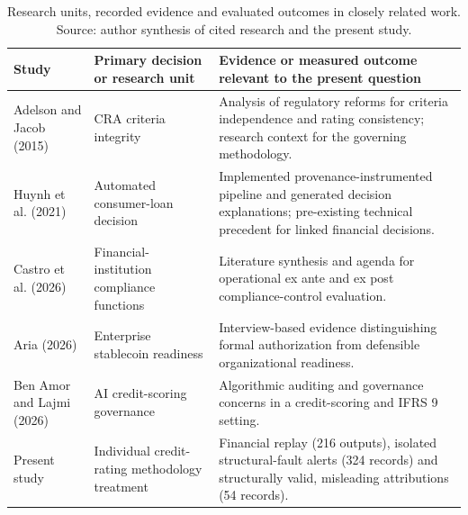 \setcounter{table}{0}
\begin{table}[!htbp]
\centering
\caption{Research units, recorded evidence and evaluated outcomes in closely related work. Source: author synthesis of cited research and the present study.}
\label{tab:lineage}
\footnotesize
\setlength{\tabcolsep}{4pt}
\renewcommand{\arraystretch}{1.22}
\begin{tabularx}{\textwidth}{p{28mm}p{30mm}X}
\toprule
\textbf{Study} & \textbf{Primary decision or research unit} & \textbf{Evidence or measured outcome relevant to the present question}\\
\midrule
Adelson and Jacob (2015) & CRA criteria integrity & Analysis of regulatory reforms for criteria independence and rating consistency; research context for the governing methodology.\\
Huynh et al. (2021) & Automated consumer-loan decision & Implemented provenance-instrumented pipeline and generated decision explanations; pre-existing technical precedent for linked financial decisions.\\
Castro et al. (2026) & Financial-institution compliance functions & Literature synthesis and agenda for operational ex ante and ex post compliance-control evaluation.\\
Aria (2026) & Enterprise stablecoin readiness & Interview-based evidence distinguishing formal authorization from defensible organizational readiness.\\
Ben Amor and Lajmi (2026) & AI credit-scoring governance & Algorithmic auditing and governance concerns in a credit-scoring and IFRS 9 setting.\\
Present study & Individual credit-rating methodology treatment & Financial replay (216 outputs), isolated structural-fault alerts (324 records) and structurally valid, misleading attributions (54 records).\\
\bottomrule
\end{tabularx}
\end{table}
